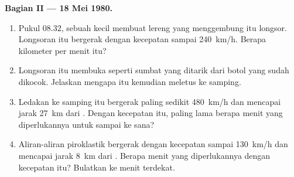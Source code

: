 \begin{problem}
\medskip
\noindent\textbf{Bagian II --- 18 Mei 1980.}\par\nopagebreak
\begin{enumerate}[resume, beginpenalty=10000]
  \item Pukul 08.32, sebuah  kecil membuat lereng yang menggembung
        itu longsor. Longsoran itu bergerak dengan kecepatan sampai
        \qty{240}{km/h}. Berapa kilometer per menit itu?
  \item Longsoran itu membuka  seperti sumbat yang ditarik dari botol
        yang sudah dikocok. Jelaskan mengapa  itu kemudian meletus
        ke samping.
  \item Ledakan ke samping itu bergerak paling sedikit \qty{480}{km/h} dan
        mencapai jarak \qty{27}{km} dari . Dengan kecepatan itu,
        paling lama berapa menit yang diperlukannya untuk sampai ke sana?
  \item Aliran-aliran piroklastik bergerak dengan kecepatan sampai
        \qty{130}{km/h} dan mencapai jarak \qty{8}{km} dari . Berapa
        menit yang diperlukannya dengan kecepatan itu? Bulatkan ke menit
        terdekat.
\end{enumerate}


\end{problem}
